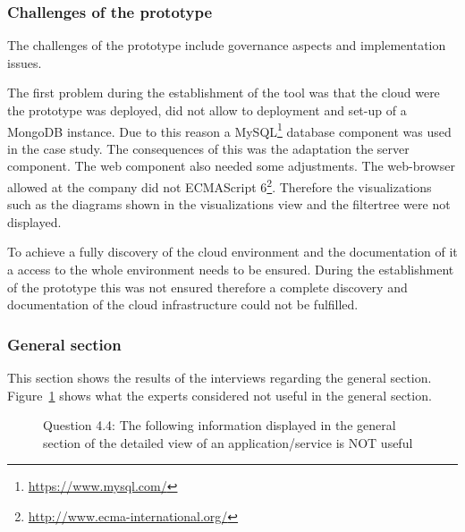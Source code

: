 \subsubsection{Challenges of the prototype}\label{subsubsection:challenges-prototype}
The challenges of the prototype include governance aspects and implementation issues.

The first problem during the establishment of the tool was that the cloud were the prototype was deployed, did not allow to deployment and set-up of a MongoDB instance. Due to this reason a MySQL\footnote{\url{https://www.mysql.com/}} database component was used in the case study. The consequences of this was the adaptation the server component. 
The web component also needed some adjustments. The web-browser allowed at the company did not ECMAScript 6\footnote{\url{http://www.ecma-international.org/}}. Therefore the visualizations such as the diagrams shown in the visualizations view and the filtertree were not displayed.

To achieve a fully discovery of the cloud environment and the documentation of it a access to the whole environment needs to be ensured. During the establishment of the prototype this was not ensured therefore a complete discovery and documentation of the cloud infrastructure could not be fulfilled.

\subsubsection{General section}

This section shows the results of the interviews regarding the general section. Figure~\ref{fig:question44} shows what the experts considered not useful in the general section.

\begin{figure}[htpb]
\centering
{}
\caption{Question 4.4: The following information displayed in the general section of the detailed view of an application/service is NOT useful}
\label{fig:question44}
\end{figure}

